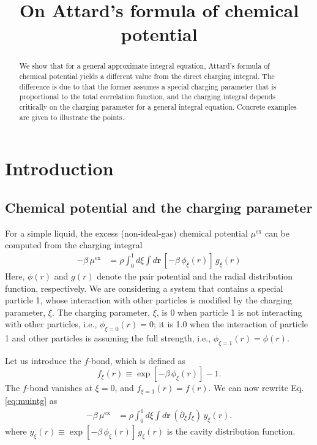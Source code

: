 \documentclass[preprint]{revtex4-1}
\newcommand{\vct}[1]{\mathbf{#1}}
\providecommand{\vr}{} %
\renewcommand{\vr}{\vct{r}}
\newcommand{\supex}[1]{ { { #1 }^{ \mathrm{ex} } } }
\newcommand{\muex}{\supex{\mu}}
\begin{document}
\title{On Attard's formula of chemical potential}

\begin{abstract}
We show that for a general approximate integral equation,
  Attard's formula of chemical potential
  yields a different value from
  the direct charging integral.
%
The difference is due to that the former
  assumes a special charging parameter that is
  proportional to the total correlation function,
%
  and the charging integral depends critically
  on the charging parameter for a general integral equation.
%
Concrete examples are given to illustrate the points.
\end{abstract}

\maketitle

\section{Introduction}



\subsection{Chemical potential and the charging parameter}



For a simple liquid,
the excess (non-ideal-gas) chemical potential $\muex$
can be computed from the charging integral
%
\begin{align}
  -\beta \, \muex
&=
  \rho \int_0^1 d\xi \int d\vr \, [-\beta \, \phi_\xi(r)] \, g_\xi(r)
  \label{eq:muintg}
\end{align}
%
Here,
$\phi(r)$ and $g(r)$ denote the pair potential
and the radial distribution function, respectively.
%
We are considering a system that contains a special particle 1,
whose interaction with other particles
is modified by the charging parameter, $\xi$.
%
The charging parameter, $\xi$, is 0
  when particle 1 is not interacting with other particles,
  i.e., $\phi_{\xi = 0}(r) = 0$;
it is 1.0
  when the interaction of particle 1 and other particles is assuming the full strength,
  i.e., $\phi_{\xi = 1}(r) = \phi(r)$.



Let us introduce the $f$-bond, which is defined as
\[
  f_\xi(r) \equiv \exp[-\beta \, \phi_\xi(r)] - 1.
\]
The $f$-bond vanishes at $\xi = 0$, and $f_{\xi = 1}(r) = f(r)$.
%
We can now rewrite Eq. \eqref{eq:muintg} as
\begin{align}
  -\beta \, \muex
&=
  \rho \int_0^1 d\xi \int d\vr \, (\partial_\xi f_\xi) \, y_\xi(r).
\label{eq:mudf}
\end{align}
%
where $y_\xi(r) \equiv \exp[-\beta \, \phi_\xi(r)] \, g_\xi(r)$
is the cavity distribution function.
\end{document}
